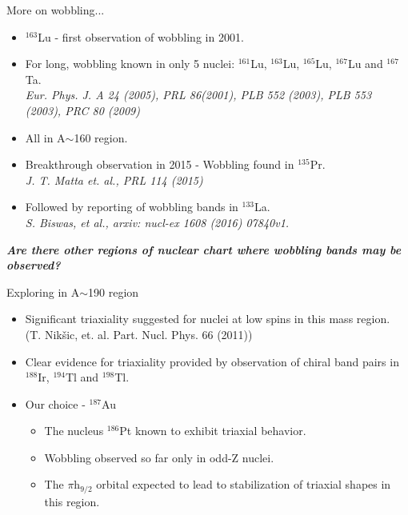 \documentclass [aspectratio=169]{beamer}
\begin{document}
\begin{frame}{More on wobbling...}
\begin{multicols}{2}
\begin{itemize}
\item{$^{163}$Lu - first observation of wobbling in 2001.}
\item{For long, wobbling known in only 5 nuclei:  $^{161}$Lu, $^{163}$Lu, $^{165}$Lu, $^{167}$Lu and $^{167}$Ta.  \\
\textit{\scriptsize{\color{violet}Eur. Phys. J. A 24 (2005), PRL 86(2001), PLB 552 (2003), PLB 553 (2003), PRC 80 (2009)}}}
\item{All in A$\sim$160 region.}

\end{itemize}

\begin{itemize}
\item{Breakthrough observation in 2015 - Wobbling found in $^{135}$Pr. \\
\textit{\scriptsize{\color{violet}J. T. Matta et. al., PRL 114 (2015)}}}
\item{Followed by reporting of wobbling bands in $^{133}$La. \\
\textit{\scriptsize{\color{violet}S. Biswas, et al., arxiv: nucl-ex 1608 (2016) 07840v1.}}}
\end{itemize}
\end{multicols}
\textbf{\textit{Are there other regions of nuclear chart where wobbling bands may be observed?}}
\end{frame}


\begin{frame}{Exploring in A$\sim$190 region}
\begin{itemize}
\item{Significant triaxiality suggested for nuclei at low spins in this mass region. \\
\scriptsize{\color{violet}(T. Nikšic, et. al. Part. Nucl. Phys. 66 (2011))}}
\item{Clear evidence for triaxiality provided by observation of chiral band pairs in $^{188}$Ir, $^{194}$Tl and $^{198}$Tl.}
\item{Our choice - $^{187}$Au}
\begin{itemize}
\item{The nucleus $^{186}$Pt known to exhibit triaxial behavior.}
\item{Wobbling observed so far only in odd-Z nuclei.}
\item{The $\pi$h$_{9/2}$ orbital expected to lead to stabilization of triaxial shapes in this region.}
\end{itemize}
\end{itemize}
\end{frame}
\end{document}
